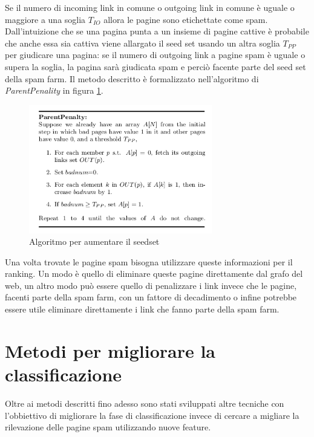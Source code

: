 Se il numero di incoming link in comune o outgoing link in comune è  uguale o maggiore a una soglia \(T_{IO}\) allora le pagine sono etichettate come spam.  Dall'intuizione che se una pagina punta a un insieme di pagine cattive è probabile che anche essa sia cattiva viene allargato il seed set usando un altra soglia \(T_{PP}\) per giudicare una pagina: se il numero di outgoing link a pagine spam è uguale o supera la soglia, la pagina sarà giudicata spam e perciò facente parte del seed set della spam farm. Il metodo descritto è formalizzato nell'algoritmo di \textit{ParentPenality} in figura \ref{fig:linkfarm2}.
\begin{figure}
\centering
\includegraphics[width=8cm]{immagini/linkfarm/immagine2.png}
\caption{Algoritmo per aumentare il seedset}
\label{fig:linkfarm2}
\end{figure}
Una volta trovate le pagine spam bisogna utilizzare queste informazioni per il ranking. Un modo è quello di eliminare queste pagine direttamente dal grafo del web, un altro modo può essere quello di penalizzare i link invece che le pagine, facenti parte della spam farm, con un fattore di decadimento o infine potrebbe essere utile eliminare direttamente i link che fanno parte della spam farm.

\section{Metodi per migliorare la classificazione}
Oltre ai metodi descritti fino adesso sono stati sviluppati altre tecniche con l'obbiettivo di migliorare la fase di classificazione invece di cercare a migliare la rilevazione delle pagine spam utilizzando nuove feature.

